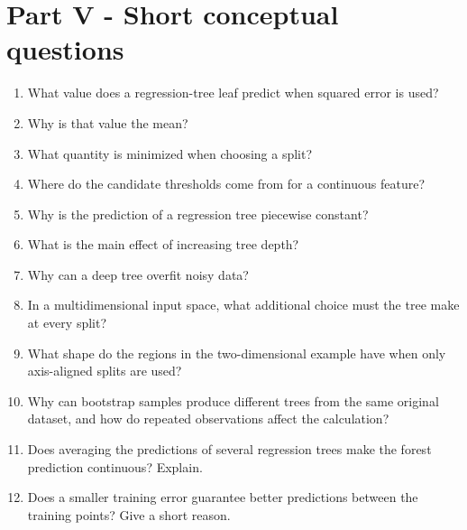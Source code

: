 \documentclass{course_sheet}
\begin{document}
\section*{Part V - Short conceptual questions}
\begin{enumerate}
\item
What value does a regression-tree leaf predict when squared error is used?

\item
Why is that value the mean?

\item
What quantity is minimized when choosing a split?

\item
Where do the candidate thresholds come from for a continuous feature?

\item
Why is the prediction of a regression tree piecewise constant?

\item
What is the main effect of increasing tree depth?

\item
Why can a deep tree overfit noisy data?

\item
In a multidimensional input space, what additional choice must the tree make at every split?

\item
What shape do the regions in the two-dimensional example have when only axis-aligned splits are used?

\item
Why can bootstrap samples produce different trees from the same original dataset, and how do repeated observations affect the calculation?

\item
Does averaging the predictions of several regression trees make the forest prediction continuous? Explain.

\item
Does a smaller training error guarantee better predictions between the training points? Give a short reason.

\end{enumerate}
\end{document}
